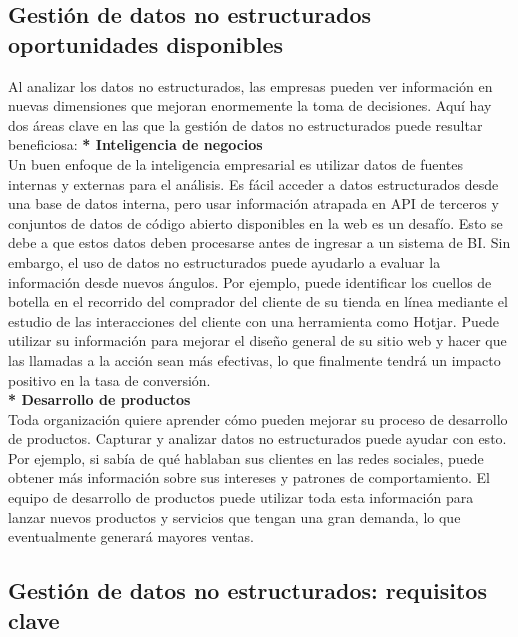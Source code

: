\documentclass[twocolumn]{article}
\begin{document}
\subsection{Gestión de datos no estructurados oportunidades disponibles}
Al analizar los datos no estructurados, las empresas pueden ver información en nuevas dimensiones que mejoran 
enormemente la toma de decisiones. Aquí hay dos áreas clave en las que la gestión de datos no estructurados puede 
resultar beneficiosa:
\textbf{* Inteligencia de negocios}\\
Un buen enfoque de la inteligencia empresarial es utilizar datos de fuentes internas y
 externas para el análisis. Es fácil acceder a datos estructurados desde una base de 
 datos interna, pero usar información atrapada en API de terceros y conjuntos de datos 
 de código abierto disponibles en la web es un desafío. Esto se debe a que estos datos 
 deben procesarse antes de ingresar a un sistema de BI. Sin embargo, el uso de datos no
  estructurados puede ayudarlo a evaluar la información desde nuevos ángulos. Por ejemplo, 
  puede identificar los cuellos de botella en el recorrido del comprador del cliente de su 
  tienda en línea mediante el estudio de las interacciones del cliente con una herramienta 
  como Hotjar. Puede utilizar su información para mejorar el diseño general de su sitio web 
  y hacer que las llamadas a la acción sean más efectivas, lo que finalmente tendrá un 
  impacto positivo en la tasa de conversión.\\

  \textbf{* Desarrollo de productos}\\
  Toda organización quiere aprender cómo pueden mejorar su 
  proceso de desarrollo de productos. Capturar y analizar
  datos no estructurados puede ayudar con esto. Por ejemplo,
   si sabía de qué hablaban sus clientes en las redes sociales,
  puede obtener más información sobre sus intereses y patrones
   de comportamiento. El equipo de desarrollo de productos puede
  utilizar toda esta información para lanzar nuevos productos
 y servicios que tengan una gran demanda, lo que eventualmente
   generará mayores ventas.
   
\subsection{Gestión de datos no estructurados: requisitos clave}
\end{document}

